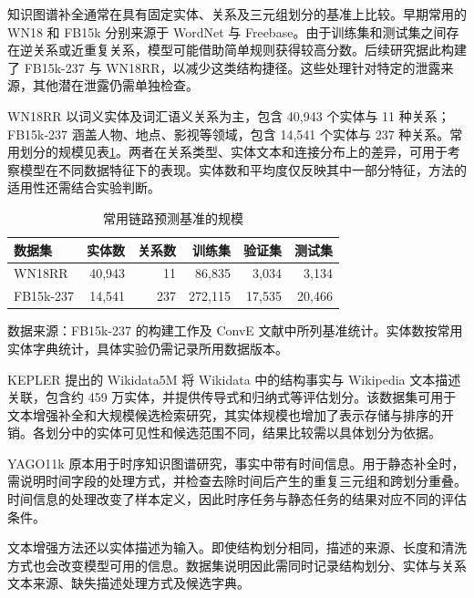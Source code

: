 知识图谱补全通常在具有固定实体、关系及三元组划分的基准上比较。早期常用的 WN18 和 FB15k 分别来源于 WordNet 与 Freebase。由于训练集和测试集之间存在逆关系或近重复关系，模型可能借助简单规则获得较高分数。后续研究据此构建了 FB15k-237 与 WN18RR，以减少这类结构捷径\cite{toutanova2015observed,dettmers2018conve}。这些处理针对特定的泄露来源，其他潜在泄露仍需单独检查。

WN18RR 以词义实体及词汇语义关系为主，包含 40,943 个实体与 11 种关系；FB15k-237 涵盖人物、地点、影视等领域，包含 14,541 个实体与 237 种关系。常用划分的规模见表\ref{tab:bg_datasets}。两者在关系类型、实体文本和连接分布上的差异，可用于考察模型在不同数据特征下的表现。实体数和平均度仅反映其中一部分特征，方法的适用性还需结合实验判断。

\begin{table}[htbp]
    \centering
    \caption{常用链路预测基准的规模}
    \label{tab:bg_datasets}
    \small
    \begin{tabular}{lrrrrr}
        \toprule
        数据集 & 实体数 & 关系数 & 训练集 & 验证集 & 测试集 \\
        \midrule
        WN18RR & 40,943 & 11 & 86,835 & 3,034 & 3,134 \\
        FB15k-237 & 14,541 & 237 & 272,115 & 17,535 & 20,466 \\
        \bottomrule
    \end{tabular}
    \par\smallskip
    \begin{minipage}{0.94\textwidth}
        \small 数据来源：FB15k-237 的构建工作及 ConvE 文献中所列基准统计\cite{toutanova2015observed,dettmers2018conve}。实体数按常用实体字典统计，具体实验仍需记录所用数据版本。
    \end{minipage}
\end{table}

KEPLER 提出的 Wikidata5M 将 Wikidata 中的结构事实与 Wikipedia 文本描述关联，包含约 459 万实体，并提供传导式和归纳式等评估划分\cite{wang2021kepler}。该数据集可用于文本增强补全和大规模候选检索研究，其实体规模也增加了表示存储与排序的开销。各划分中的实体可见性和候选范围不同，结果比较需以具体划分为依据。

YAGO11k 原本用于时序知识图谱研究，事实中带有时间信息\cite{dasgupta2018hyte}。用于静态补全时，需说明时间字段的处理方式，并检查去除时间后产生的重复三元组和跨划分重叠。时间信息的处理改变了样本定义，因此时序任务与静态任务的结果对应不同的评估条件。

文本增强方法还以实体描述为输入。即使结构划分相同，描述的来源、长度和清洗方式也会改变模型可用的信息。数据集说明因此需同时记录结构划分、实体与关系文本来源、缺失描述处理方式及候选字典。

